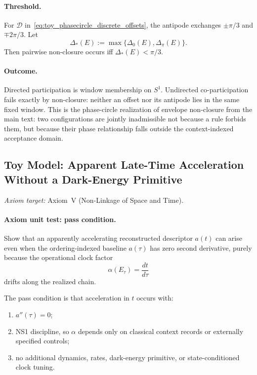\documentclass[aps,prx,onecolumn,11pt]{revtex4-2}
\theoremstyle{plain}
\theoremstyle{definition}
\theoremstyle{remark}
\begin{document}
\paragraph{Threshold.}
For $\mathcal{D}$ in~\eqref{eq:toy_phasecircle_discrete_offsets},
the antipode exchanges $\pm\pi/3$ and $\mp 2\pi/3$. Let
\[
\Delta_\ast(E) := \max\{\Delta_0(E), \Delta_\pi(E)\}.
\]
Then pairwise non-closure occurs iff $\Delta_\ast(E) < \pi/3$.

\paragraph{Outcome.}
Directed participation is window membership on $S^1$. Undirected
co-participation fails exactly by non-closure: neither an offset nor
its antipode lies in the same fixed window. This is the phase-circle
realization of envelope non-closure from the main text: two
configurations are jointly inadmissible not because a rule forbids
them, but because their phase relationship falls outside the
context-indexed acceptance domain.

\subsection{Toy Model: Apparent Late-Time Acceleration Without a Dark-Energy Primitive}
\label{toy:no_dark_energy}

\noindent\emph{Axiom target:} Axiom~V (Non-Linkage of Space and Time).

\paragraph{Axiom unit test: pass condition.}

Show that an apparently accelerating reconstructed descriptor \(a(t)\)
can arise even when the ordering-indexed baseline \(a(\tau)\) has zero
second derivative, purely because the operational clock factor
\[
\alpha(E_\tau)=\frac{dt}{d\tau}
\]
drifts along the realized chain.

The pass condition is that acceleration in \(t\) occurs with:

\begin{enumerate}[label=(\roman*), leftmargin=2.2em]
\item \(a''(\tau)=0\);
\item NS1 discipline, so \(\alpha\) depends only on classical
context records or externally specified controls;
\item no additional dynamics, rates, dark-energy primitive, or
state-conditioned clock tuning.
\end{enumerate}
\end{document}
